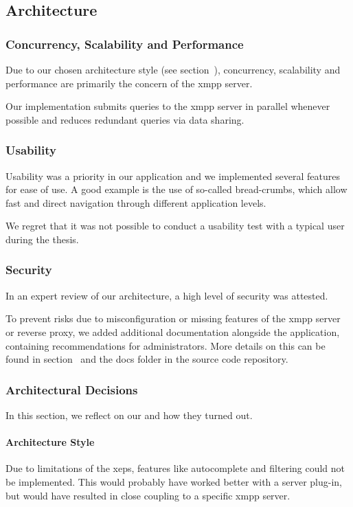 \subsection{Architecture}

\subsubsection{Concurrency, Scalability and Performance}
Due to our chosen architecture style (see section~),
concurrency, scalability and performance are primarily the concern of the \gls{xmpp} server.

Our implementation submits queries to the \gls{xmpp} server in parallel whenever possible and reduces redundant queries via data sharing.

\subsubsection{Usability}
Usability was a priority in our application and we implemented several features for ease of use.
A good example is the use of so-called bread-crumbs, which allow fast and direct navigation through different application levels.

We regret that it was not possible to conduct a usability test with a typical user during the thesis.

\subsubsection{Security}
In an expert review of our architecture, a high level of security was attested.

To prevent risks due to misconfiguration or missing features of the \gls{xmpp} server or reverse proxy, we added additional documentation alongside the application, containing recommendations for administrators.
More details on this can be found in section~ and the docs folder in the source code repository.

\subsubsection{Architectural Decisions}
In this section, we reflect on our  and how they turned out.

\paragraph{Architecture Style}
Due to limitations of the \glspl{xep}, features like autocomplete and filtering could not be implemented.
This would probably have worked better with a server plug-in, but would have resulted in close coupling to a specific \gls{xmpp} server.

